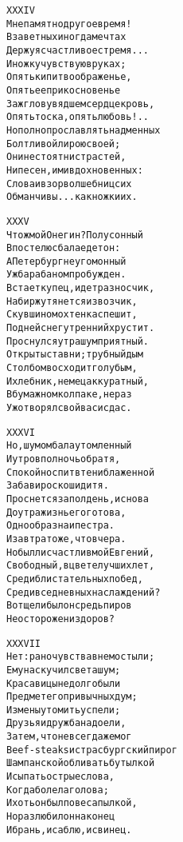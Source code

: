 \begin{minipage}[t]{\dimexpr 0.5\textwidth -\tabcolsep-.5pt}
\begin{alltt}\normalfont\centering
XXXIV
Мне памятно другое время!
В заветных иногда мечтах
Держу я счастливое стремя...
И ножку чувствую в руках;
Опять кипит воображенье,
Опять ее прикосновенье
Зажгло в увядшем сердце кровь,
Опять тоска, опять любовь!..
Но полно прославлять надменных
Болтливой лирою своей;
Они не стоят ни страстей,
Ни песен, ими вдохновенных:
Слова и взор волшебниц сих
Обманчивы... как ножки их.
\end{alltt}
\end{minipage}
\clearpage

\begin{minipage}[t]{\dimexpr 0.5\textwidth -\tabcolsep-.5pt}
\begin{alltt}\normalfont\centering
XXXV
Что ж мой Онегин? Полусонный
В постелю с бала едет он:
А Петербург неугомонный
Уж барабаном пробужден.
Встает купец, идет разносчик,
На биржу тянется извозчик,
С кувшином охтенка спешит,
Под ней снег утренний хрустит.
Проснулся утра шум приятный.
Открыты ставни; трубный дым
Столбом восходит голубым,
И хлебник, немец аккуратный,
В бумажном колпаке, не раз
Уж отворял свой васисдас.
\end{alltt}
\end{minipage}

\begin{minipage}[t]{\dimexpr 0.5\textwidth -\tabcolsep-.5pt}
\begin{alltt}\normalfont\centering
XXXVI
Но, шумом бала утомленный
И утро в полночь обратя,
Спокойно спит в тени блаженной
Забав и роскоши дитя.
Проснется за полдень, и снова
До утра жизнь его готова,
Однообразна и пестра.
И завтра то же, что вчера.
Но был ли счастлив мой Евгений,
Свободный, в цвете лучших лет,
Среди блистательных побед,
Среди вседневных наслаждений?
Вотще ли был он средь пиров
Неосторожен и здоров?
\end{alltt}
\end{minipage}
\clearpage

\begin{minipage}[t]{\dimexpr 0.5\textwidth -\tabcolsep-.5pt}
\begin{alltt}\normalfont\centering
XXXVII
Нет: рано чувства в нем остыли;
Ему наскучил света шум;
Красавицы не долго были
Предмет его привычных дум;
Измены утомить успели;
Друзья и дружба надоели,
Затем, что не всегда же мог
Beef-steaks и страсбургский пирог
Шампанской обливать бутылкой
И сыпать острые слова,
Когда болела голова;
И хоть он был повеса пылкой,
Но разлюбил он наконец
И брань, и саблю, и свинец.
\end{alltt}
\end{minipage}


